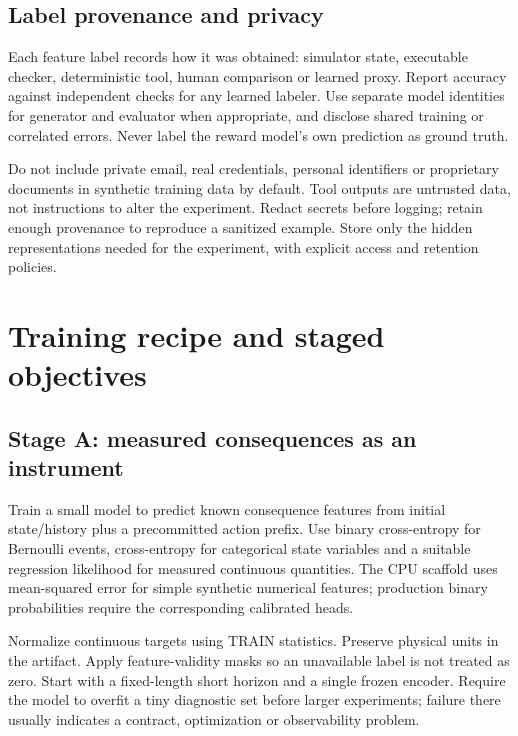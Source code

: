 \documentclass[
  11pt,
  a4paper,
]{article}
\begin{document}
\subsection{Label provenance and
privacy}\label{label-provenance-and-privacy}

Each feature label records how it was obtained: simulator state,
executable checker, deterministic tool, human comparison or learned
proxy. Report accuracy against independent checks for any learned
labeler. Use separate model identities for generator and evaluator when
appropriate, and disclose shared training or correlated errors. Never
label the reward model's own prediction as ground truth.

Do not include private email, real credentials, personal identifiers or
proprietary documents in synthetic training data by default. Tool
outputs are untrusted data, not instructions to alter the experiment.
Redact secrets before logging; retain enough provenance to reproduce a
sanitized example. Store only the hidden representations needed for the
experiment, with explicit access and retention policies.

\section{Training recipe and staged
objectives}\label{training-recipe-and-staged-objectives}

\subsection{Stage A: measured consequences as an
instrument}\label{stage-a-measured-consequences-as-an-instrument}

Train a small model to predict known consequence features from initial
state/history plus a precommitted action prefix. Use binary
cross-entropy for Bernoulli events, cross-entropy for categorical state
variables and a suitable regression likelihood for measured continuous
quantities. The CPU scaffold uses mean-squared error for simple
synthetic numerical features; production binary probabilities require
the corresponding calibrated heads.

Normalize continuous targets using TRAIN statistics. Preserve physical
units in the artifact. Apply feature-validity masks so an unavailable
label is not treated as zero. Start with a fixed-length short horizon
and a single frozen encoder. Require the model to overfit a tiny
diagnostic set before larger experiments; failure there usually
indicates a contract, optimization or observability problem.
\end{document}
